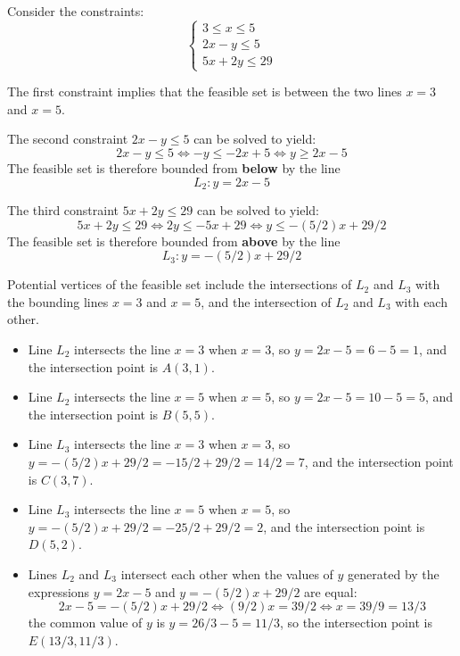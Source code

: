 \documentclass{article}
\begin{document}
Consider the constraints:
\[\left\{\begin{array}{c}
3 \leq x \leq 5 \\
2x - y \leq 5 \\
5x + 2y \leq 29
\end{array}\right.\]

The first constraint implies that the feasible set is between the two lines \(x = 3\) and \(x = 5\).

The second constraint \(2x - y \leq 5\) can be solved to yield:
\[2x - y \leq 5 \iff -y \leq -2x + 5 \iff y \geq 2x - 5\]
The feasible set is therefore bounded from {\bf below} by the line
\[L_2 : y = 2x - 5\]

The third constraint \(5x + 2y \leq 29\) can be solved to yield:
\[5x + 2y \leq 29 \iff 2y \leq -5x + 29 \iff y \leq -(5/2)x + 29/2\]
The feasible set is therefore bounded from {\bf above} by the line
\[L_3 : y = -(5/2)x + 29/2\]

Potential vertices of the feasible set include the intersections of \(L_2\) and \(L_3\) with the bounding lines \(x = 3\) and \(x = 5\), and the intersection of \(L_2\) and \(L_3\) with each other. 
\begin{itemize}
\item Line \(L_2\) intersects the line \(x = 3\) when \(x = 3\), so \(y = 2x - 5 = 6 - 5 = 1\), and the intersection point is \(A(3, 1)\). 
\item Line \(L_2\) intersects the line \(x = 5\) when \(x = 5\), so \(y = 2x - 5 = 10 - 5 = 5\), and the intersection point is \(B(5, 5)\). 
\item Line \(L_3\) intersects the line \(x = 3\) when \(x = 3\), so \(y = -(5/2)x + 29/2 = -15/2 + 29/2 = 14/2 = 7\), and the intersection point is \(C(3, 7)\). 
\item Line \(L_3\) intersects the line \(x = 5\) when \(x = 5\), so \(y = -(5/2)x + 29/2 = -25/2 + 29/2 = 2\), and the intersection point is \(D(5, 2)\). 
\item Lines \(L_2\) and \(L_3\) intersect each other when the values of \(y\) generated by the expressions \(y = 2x - 5\) and \(y = -(5/2)x + 29/2\) are equal:
\[2x - 5 = -(5/2)x + 29/2 \iff (9/2)x = 39/2 \iff x = 39/9 = 13/3\]
the common value of \(y\) is \(y = 26/3 - 5 = 11/3\), so the intersection point is \(E(13/3,11/3)\).
\end{itemize}
\end{document}
